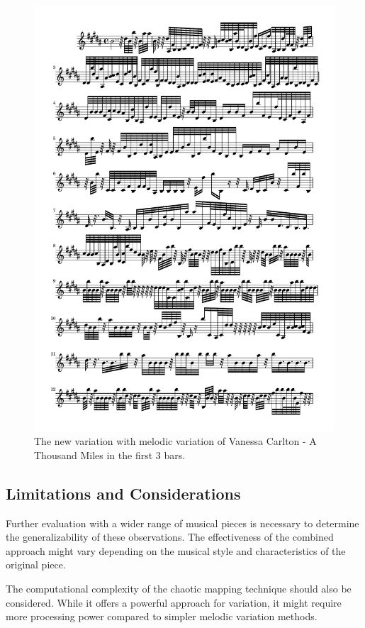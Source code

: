 \documentclass[11pt]{article}
\theoremstyle{definition}
\begin{document}
\begin{figure}
\centering
\includegraphics[trim=1cm 23.75cm 1cm 0.5cm, clip, scale=0.6]{New_ATM.pdf}
\caption{The new variation with melodic variation of Vanessa Carlton - A Thousand Miles in the first 3 bars.} 
\label{fig:NATM}
\end{figure}

\subsection{Limitations and Considerations}

Further evaluation with a wider range of musical pieces is necessary to determine the generalizability of these observations. The effectiveness of the combined approach might vary depending on the musical style and characteristics of the original piece.

The computational complexity of the chaotic mapping technique should also be considered. While it offers a powerful approach for variation, it might require more processing power compared to simpler melodic variation methods.
\end{document}
